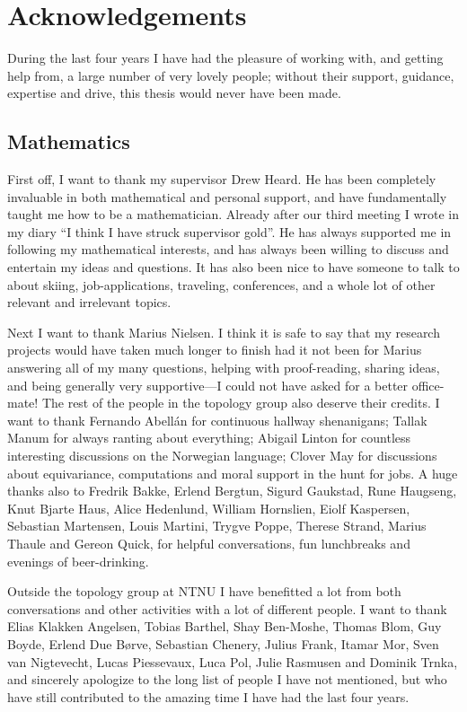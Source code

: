 
\section*{Acknowledgements}

During the last four years I have had the pleasure of working with, and getting help from, a large number of very lovely people; without their support, guidance, expertise and drive, this thesis would never have been made. 

\subsection*{Mathematics}

First off, I want to thank my supervisor Drew Heard. He has been completely invaluable in both mathematical and personal support, and have fundamentally taught me how to be a mathematician. Already after our third meeting I wrote in my diary ``I think I have struck supervisor gold''. He has always supported me in following my mathematical interests, and has always been willing to discuss and entertain my ideas and questions. It has also been nice to have someone to talk to about skiing, job-applications, traveling, conferences, and a whole lot of other relevant and irrelevant topics. 

Next I want to thank Marius Nielsen. I think it is safe to say that my research projects would have taken much longer to finish had it not been for Marius answering all of my many questions, helping with proof-reading, sharing ideas, and being generally very supportive---I could not have asked for a better office-mate! The rest of the people in the topology group also deserve their credits. I want to thank Fernando Abellán for continuous hallway shenanigans; Tallak Manum for always ranting about everything; Abigail Linton for countless interesting discussions on the Norwegian language; Clover May for discussions about equivariance, computations and moral support in the hunt for jobs. A huge thanks also to 
Fredrik Bakke, 
Erlend Bergtun, 
Sigurd Gaukstad, 
Rune Haugseng,
Knut Bjarte Haus, 
Alice Hedenlund, 
William Hornslien, 
Eiolf Kaspersen, 
Sebastian Martensen, 
Louis Martini,
Trygve Poppe, 
Therese Strand, 
Marius Thaule and 
Gereon Quick, 
for helpful conversations, fun lunchbreaks and evenings of beer-drinking.

Outside the topology group at NTNU I have benefitted a lot from both conversations and other activities with a lot of different people. I want to thank 
Elias Klakken Angelsen, 
Tobias Barthel, 
Shay Ben-Moshe, 
Thomas Blom, 
Guy Boyde,
Erlend Due Børve, 
Sebastian Chenery, 
Julius Frank, 
Itamar Mor, 
Sven van Nigtevecht, 
Lucas Piessevaux, 
Luca Pol, 
Julie Rasmusen and 
Dominik Trnka, 
and sincerely apologize to the long list of people I have not mentioned, but who have still contributed to the amazing time I have had the last four years. 

